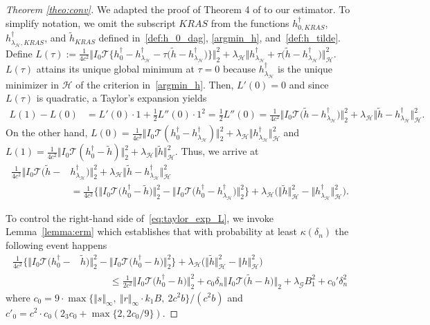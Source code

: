 \documentclass[twoside,11pt]{article}
\newcommand{\mc}{\mathcal}
\begin{document}
\begin{proof}[Theorem \ref{theo:conv}]
    We adapted the proof of Theorem 4 of \cite{bennett2023source} to our estimator. To simplify notation, we omit the subscript $KRAS$ from the functions $h_{0,KRAS}^\dag$, $h_{\lambda_\mc{H},KRAS}^\dag$, and $\tilde h_{KRAS}$ defined in~\eqref{def:h_0_dag}, \eqref{argmin_h}, and~\eqref{def:h_tilde}. Define $ L(\tau):=\frac{1}{4c^2}\big\Vert I_0\mc{T}\big\{h_{0}^\dag-h_{\lambda_\mc{H}}^\dag-\tau\big(\tilde h-h_{\lambda_\mc{H}}^\dag\big)\big\}\big\Vert_2^2+\lambda_{\mc{H}}\big\Vert  h_{\lambda_\mc{H}}^\dag+\tau\big(\tilde h- h_{\lambda_\mc{H}}^\dag\big)\big\Vert_{\mc{H}}^2$. $L(\tau)$ attains its unique global minimum at $\tau=0$ because $h_{\lambda_\mc{H}}^\dag$ is the unique minimizer in $\mc{H}$ of the criterion in~\eqref{argmin_h}. Then, $L'(0)=0$ and since $L(\tau)$ is quadratic, a Taylor's expansion yields
        \begin{align*}
            L(1)-L(0)&=L'(0)\cdot 1+\frac{1}{2}L''(0)\cdot 1^2=\frac{1}{2}L''(0)=\frac{1}{4c^2}\big\Vert I_0\mc{T}\big(\tilde h-h_{\lambda_\mc{H}}^\dag\big)\big\Vert_2^2+\lambda_{\mc{H}}\big\Vert \tilde h- h_{\lambda_\mc{H}}^\dag\big\Vert_{\mc{H}}^2.
        \end{align*}
        On the other hand, $L(0) =\frac{1}{4c^2}\Vert   I_0\mc{T}(h_0^\dag-h_{\lambda_\mc{H}}^\dag)\Vert_2^2+\lambda_{\mc{H}}\Vert h_{\lambda_\mc{H}}^\dag\Vert_{\mc{H}}^2$ and $ L(1)=\frac{1}{4c^2}\Vert  I_0\mc{T}(h_0^\dag-\tilde h)\Vert_2^2+\lambda_{\mc{H}}\Vert \tilde h\Vert_{\mc{H}}^2$.
         Thus, we arrive at 
         \begin{align}
           \frac{1}{4c^2}\big\Vert I_0\mc{T}\big(\tilde h-&h_{\lambda_\mc{H}}^\dag\big)\big\Vert_2^2+\lambda_{\mc{H}}\big\Vert \tilde h- h_{\lambda_\mc{H}}^\dag\big\Vert_{\mc{H}}^2\label{eq:taylor_exp_L}\\
           &= \frac{1}{4c^2}\Big\{\big\Vert   I_0\mc{T}\big(h_0^\dag-\tilde h\big)\big\Vert_2^2-\big\Vert I_0\mc{T}\big(h_0^\dag-h_{\lambda_\mc{H}}^\dag\big)\big\Vert_2^2\Big\}\nonumber+\lambda_{\mc{H}}\Big(\big\Vert \tilde h\big\Vert_{\mc{H}}^2-\big\Vert h_{\lambda_\mc{H}}^\dag\big\Vert_{\mc{H}}^2\Big).
        \end{align}

        To control the right-hand side of~\eqref{eq:taylor_exp_L}, we invoke Lemma~\ref{lemma:erm} which establishes that with probability at least $\kappa(\delta_n)$ the following event happens
        \begin{align*}
    \frac{1}{4c^2}\Big\{\big\Vert I_0 \mc{T} \big(h_0^\dag-&\tilde h\big)\big\Vert^2_2-\big\Vert I_0\mc{T} \big(h_0^\dag-h\big)\big\Vert^2_2\Big\}+\lambda_{\mc{H}}\Big(\big\Vert \tilde h\big\Vert_{\mc{H}}^2-\big\Vert h\big\Vert_{\mc{H}}^2\Big)\\
     &\quad\quad\quad\le \frac{1}{2c^2}\big\Vert I_0\mc{T} \big(h_0^\dag-h\big)\big\Vert^2_2+c_0\delta_n\big\Vert  I_0\mc{T}\big(\tilde h-h\big)\big\Vert_2+\lambda_{\mc{G}}B_1^2+c_0'\delta^2_n
\end{align*}
        where $c_0=9\cdot\max\{\Vert s\Vert_\infty,\:\Vert r\Vert_\infty\cdot k_1B,\: 2c^2b\}/(c^2 b)$ and $c'_0=c^2\cdot c_0(2_3c_0+\max\{2,2c_0/9\})$.


\end{proof}
\end{document}
